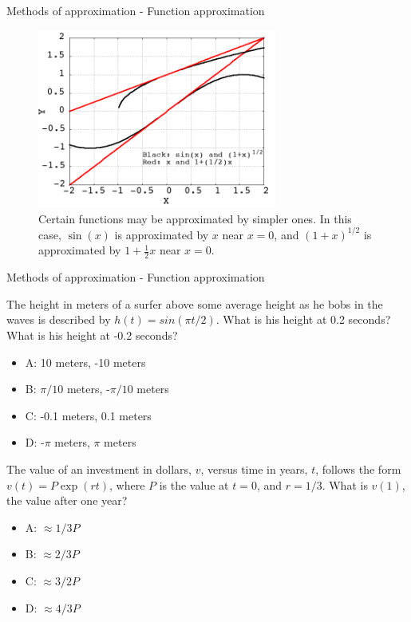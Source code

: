 \documentclass{beamer}
\begin{document}
\begin{frame}{Methods of approximation - Function approximation}
\begin{figure}
\centering
\includegraphics[width=0.7\textwidth]{figures/taylor_series.png}
\caption{\label{fig:approx} Certain functions may be approximated by simpler ones.  In this case, $\sin(x)$ is approximated by $x$ near $x=0$, and $(1+x)^{1/2}$ is approximated by $1+\frac{1}{2}x$ near $x=0$.}
\end{figure}
\end{frame}

\begin{frame}{Methods of approximation - Function approximation}
\small
\begin{minipage}[b]{0.45\linewidth}
The height in meters of a surfer above some average height as he bobs in the waves is described by $h(t) = sin(\pi t/2)$.  What is his height at 0.2 seconds?  What is his height at -0.2 seconds?
\vspace{0.2cm}
\begin{itemize}
\item A: 10 meters, -10 meters
\item B: $\pi/10$ meters, -$\pi/10$ meters
\item C: -0.1 meters, 0.1 meters
\item D: -$\pi$ meters, $\pi$ meters
\end{itemize}
\end{minipage}
\hspace{0.5cm}
\begin{minipage}[b]{0.45\linewidth}
The value of an investment in dollars, $v$, versus time in years, $t$, follows the form $v(t) = P\exp(rt)$, where $P$ is the value at $t=0$, and $r=1/3$.  What is $v(1)$, the value after one year?
\vspace{0.6cm}
\begin{itemize}
\item A: $\approx 1/3 P$
\item B: $\approx 2/3 P$
\item C: $\approx 3/2 P$
\item D: $\approx 4/3 P$
\end{itemize}
\end{minipage}
\end{frame}
\end{document}
